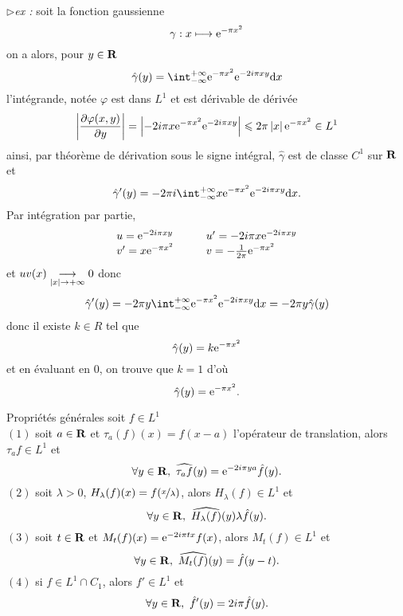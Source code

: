 \documentclass[a4paper,11pt, twoside]{article}
\begin{document}
$\triangleright$\emph{ex :} soit la fonction gaussienne 
$$\gamma:x\longmapsto \mathrm{e}^{-\pi x^2}$$
on a alors, pour $y\in\mathbf R$
$$\hat \gamma (y)=\intr\ex{-\pi x^2}\ex{-2i\pi xy}\dx$$
l'intégrande, notée $\varphi$ est dans $L^1$ et est dérivable de dérivée  
$$\left| \frac{\partial \varphi(x,y)}{\partial y}\right|=\left| -2i\pi x\mathrm{e}^{-\pi x^2}\mathrm{e}^{-2i\pi xy}\right|\leqslant 2\pi\left| x\right|\mathrm{e}^{-\pi x^2}\in L^1$$
ainsi, par théorème de dérivation sous le signe intégral, $\hat\gamma$ est de classe $C^1$ sur $\mathbf R$ et 
$$\hat \gamma'(y)=-2\pi i\intr x\ex{-\pi x^2}\ex{-2i\pi xy}\dx.$$
Par intégration par partie, 
$$\begin{array}{lllc}
  &u=\mathrm{e}^{-2i\pi xy}\qquad &u'=-2i\pi x\mathrm{e}^{-2i\pi xy}&\\
  &v'=x\mathrm{e}^{-\pi x^2}&v=-\frac{1}{2\pi}\mathrm{e}^{-\pi x^2}&
\end{array}$$
et $uv(x)\underset{\left| x\right|\to +\infty}{\longrightarrow}0$ donc 
$$\hat \gamma'(y)=-2\pi y\intr \ex{-\pi x^2}\ex{-2i\pi xy}\dx=-2\pi y\hat \gamma(y)$$
donc il existe $k\in R$ tel que 
$$\hat\gamma (y)=k\mathrm{e}^{-\pi x^2}$$
et en évaluant en $0$, on trouve que $k=1$ d'où 
$$\hat\gamma (y)=\mathrm{e}^{-\pi x^2}.$$


\begin{propC}{Propriétés générales } soit $f\in L^1$\\

  $(\mathit 1)$ soit $a\in\mathbf R$ et $\tau_a(f)(x)=f(x-a)$ l'opérateur de translation, alors $\tau_af\in L^1$ et 
  $$\forall y\in\R,\ \widehat{\tau_af}(y)=\ex{-2i\pi ya}\hat f(y).$$
  $(\mathit 2)$ soit $\lambda>0$, $H_\lambda(f)(x)=f(\nicefrac{x}{\lambda})$, alors $H_\lambda(f)\in L^1$ et 
  $$\forall y\in\R,\ \widehat{H_\lambda(f)}(y)\lambda \hat f(y).$$
  $(\mathit 3)$ soit $t\in\mathbf R$ et $M_t(f)(x)=\mathrm{e}^{-2i\pi tx}f(x)$, alors $M_t(f)\in L^1$ et 
  $$\forall y\in\R,\ \widehat{M_t(f)}(y)=\hat f(y-t).$$
  $(\mathit 4)$ si $f\in L^1\cap C_1$, alors $f'\in L^1$ et 
  $$\forall y\in\mathbf R,\ \hat f'(y)=2i\pi \hat f(y).$$
\end{propC}
\end{document}
